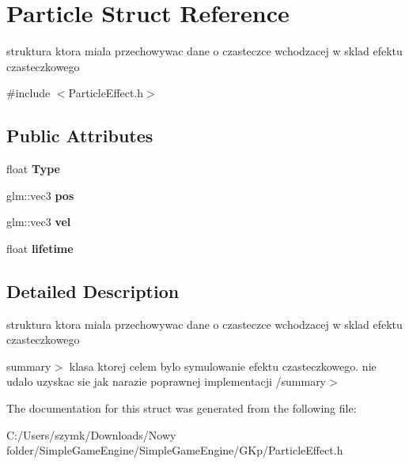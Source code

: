 \hypertarget{struct_particle}{}\section{Particle Struct Reference}
\label{struct_particle}


struktura ktora miala przechowywac dane o czasteczce wchodzacej w sklad efektu czasteczkowego  




{\ttfamily \#include $<$Particle\+Effect.\+h$>$}

\subsection*{Public Attributes}
\begin{DoxyCompactItemize}
\item 
\mbox{\label{struct_particle_a7ad881a8dce87feffc32c1e559bd4dc6}} 
float {\bfseries Type}
\item 
\mbox{\label{struct_particle_ac6f55dcf2b61777d96661bca388d695f}} 
glm\+::vec3 {\bfseries pos}
\item 
\mbox{\label{struct_particle_abdb526567f32b0d5c32a9ccb3c53d412}} 
glm\+::vec3 {\bfseries vel}
\item 
\mbox{\label{struct_particle_a79e332f17a1b96210a5ae3ce99f68c99}} 
float {\bfseries lifetime}
\end{DoxyCompactItemize}


\subsection{Detailed Description}
struktura ktora miala przechowywac dane o czasteczce wchodzacej w sklad efektu czasteczkowego 

summary$>$ klasa ktorej celem bylo symulowanie efektu czasteczkowego. nie udalo uzyskac sie jak narazie poprawnej implementacji /summary$>$ 

The documentation for this struct was generated from the following file\+:\begin{DoxyCompactItemize}
\item 
C\+:/\+Users/szymk/\+Downloads/\+Nowy folder/\+Simple\+Game\+Engine/\+Simple\+Game\+Engine/\+G\+Kp/Particle\+Effect.\+h\end{DoxyCompactItemize}
